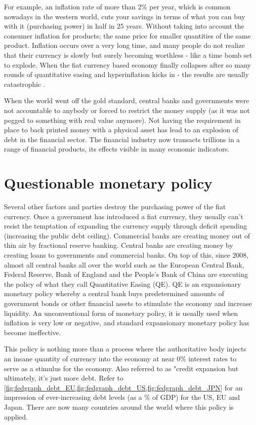For example, an inflation rate of more than 2\% per year, which is common nowadays in the western world, cuts your savings in terms of what you can buy with it (purchasing power) in half in 25 years. Without taking into account the consumer inflation for products; the same price for smaller quantities of the same product. Inflation occurs over a very long time, and many people do not realize that their currency is slowly but surely becoming worthless - like a time bomb set to explode. When the fiat currency based economy finally collapses after so many rounds of quantitative easing and hyperinflation kicks in - the results are usually catastrophic \parencite{weimarhyperinflation}. \medskip

\noindent When the world went off the gold standard, central banks and governments were not accountable to anybody or forced to restrict the money supply (as it was not pegged to something with real value anymore). Not having the requirement in place to back printed money with a physical asset has lead to an explosion of debt in the financial sector. The financial industry now transacts trillions in a range of financial products, its effects visible in many economic indicators.\medskip


\section{Questionable monetary policy}
Several other factors and parties destroy the purchasing power of the fiat currency. Once a government has introduced a fiat currency, they usually can't resist the temptation of expanding the currency supply through deficit spending (increasing the public debt ceiling). Commercial banks are creating money out of thin air by fractional reserve banking. Central banks are creating money by creating loans to governments and commercial banks. On top of this, since 2008, almost all central banks all over the world such as the European Central Bank, Federal Reserve, Bank of England and the People's Bank of China are executing the policy of what they call Quantitative Easing (QE). QE is an expansionary monetary policy whereby a central bank buys predetermined amounts of government bonds or other financial assets to stimulate the economy and increase liquidity. An unconventional form of monetary policy, it is usually used when inflation is very low or negative, and standard expansionary monetary policy has become ineffective.

This policy is nothing more than a process where the authoritative body injects an insane quantity of currency into the economy at near 0\% interest rates to serve as a stimulus for the economy. Also referred to as "credit expansion but ultimately, it's just more debt. Refer to \cref{fig:fedgraph_debt_EU,fig:fedgraph_debt_US,fig:fedgraph_debt_JPN} for an impression of ever-increasing debt levels (as a \% of GDP) for the US, EU and Japan. There are now many countries around the world where this policy is applied.



